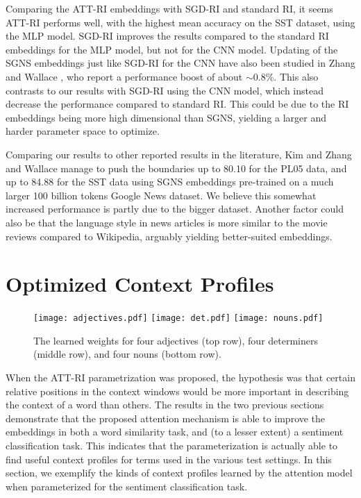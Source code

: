 \documentclass[11pt]{article}
\begin{document}
Comparing the ATT-RI embeddings with SGD-RI and standard RI, it seems ATT-RI performs well, with the highest mean accuracy on the SST dataset, using the MLP model. SGD-RI improves the results compared to the standard RI embeddings for the MLP model, but not for the CNN model. Updating of the SGNS embeddings just like SGD-RI for the CNN have also been studied in Zhang and Wallace , who report a performance boost of about $\sim$0.8\%. This also contrasts to our results with SGD-RI using the CNN model, which instead decrease the performance compared to standard RI. This could be due to the RI embeddings being more high dimensional than SGNS, yielding a larger and harder parameter space to optimize.

Comparing our results to other reported results in the literature, Kim  and Zhang and Wallace  manage to push the boundaries up to 80.10 for the PL05 data, and up to 84.88 for the SST data using SGNS embeddings pre-trained on a much larger 100 billion tokens Google News dataset. We believe this somewhat increased performance is partly due to the bigger dataset. Another factor could also be that the language style in news articles is more similar to the movie reviews compared to Wikipedia, arguably yielding better-suited embeddings.
 
\section{Optimized Context Profiles}

\begin{figure*}[t]
  \centering
  \texttt{[image: adjectives.pdf]}
    \texttt{[image: det.pdf]}
      \texttt{[image: nouns.pdf]}
  \caption{\label{fig:att_ri_adj} The learned weights for four adjectives (top row), four determiners (middle row), and four nouns (bottom row).}
\end{figure*}

When the ATT-RI parametrization was proposed, the hypothesis was that certain relative positions in the context windows would be more important in describing the context of a word than others. The results in the two previous sections demonstrate that the proposed attention mechanism is able to improve the embeddings in both a word similarity task, and (to a lesser extent) a sentiment classification task. This indicates that the parameterization is actually able to find useful context profiles for terms used in the various test settings. In this section, we exemplify the kinds of context profiles learned by the attention model when parameterized for the sentiment classification task. 
\end{document}
